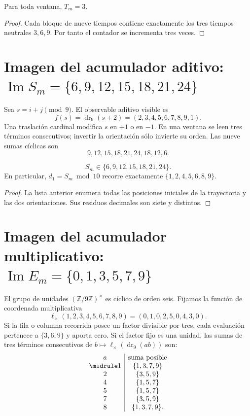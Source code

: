 \begin{lemma}
Para toda ventana, \(T_m=3\).
\end{lemma}
\begin{proof}
Cada bloque de nueve tiempos contiene exactamente los tres tiempos neutrales
\(3,6,9\). Por tanto el contador se incrementa tres veces.
\end{proof}

\section{Imagen del acumulador aditivo: \(\operatorname{Im}S_m=\{6,9,12,15,18,21,24\}\)}

Sea \(s=i+j\pmod9\). El observable aditivo visible es
\[
f(s)=\operatorname{dr}_9(s+2)=(2,3,4,5,6,7,8,9,1).
\]
Una traslación cardinal modifica \(s\) en \(+1\) o en \(-1\). En una ventana se
leen tres términos consecutivos; invertir la orientación sólo invierte su
orden. Las nueve sumas cíclicas son
\[
9,12,15,18,21,24,18,12,6.
\]

\begin{lemma}
\[
S_m\in\{6,9,12,15,18,21,24\}.
\]
En particular, \(d_1=S_m\bmod10\) recorre exactamente
\(\{1,2,4,5,6,8,9\}\).
\end{lemma}
\nopagebreak[4]
\begin{proof}
La lista anterior enumera todas las posiciones iniciales de la trayectoria y las
dos orientaciones. Sus residuos decimales son siete y distintos.\qedhere
\end{proof}

\section{Imagen del acumulador multiplicativo: \(\operatorname{Im}E_m=\{0,1,3,5,7,9\}\)}

El grupo de unidades \((\mathbb Z/9\mathbb Z)^\times\) es cíclico de orden
seis. Fijamos la función de coordenada multiplicativa
\[
\ell_\times(1,2,3,4,5,6,7,8,9)=(0,1,0,2,5,0,4,3,0).
\]
Si la fila o columna recorrida posee un factor divisible por tres, cada
evaluación pertenece a \(\{3,6,9\}\) y aporta cero. Si el factor fijo es una
unidad, las sumas de tres términos consecutivos de
\(b\mapsto\ell_\times(\operatorname{dr}_9(ab))\) son:
\[
\begin{array}{c|c}
a&\text{suma posible}\\
\midrule
1&\{1,3,7,9\}\\
2&\{3,5,9\}\\
4&\{1,5,7\}\\
5&\{1,5,7\}\\
7&\{3,5,9\}\\
8&\{1,3,7,9\}.
\end{array}
\]

